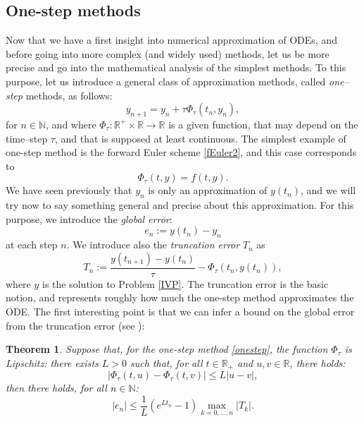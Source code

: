 \documentclass{article}
\newtheorem{theorem}{Theorem}
\begin{document}

\subsection{One-step methods}

Now that we have a first insight into numerical approximation of ODEs, and before going into more complex (and widely used) methods, let us be more precise and go into the mathematical analysis of the simplest methods.
%
%
%
To this purpose, let us introduce a general class of approximation methods, called \emph{one--step} methods, as follows:
\begin{equation} \label{onestep}
y_{n+1} = y_n + \tau \Phi_\tau ( t_n , y_n ),    
\end{equation}
for $n\in\mathbb{N}$, and where $\Phi_\tau : \mathbb{R}^+ \times \mathbb{R} \rightarrow \mathbb{R}$ is a given function, that may depend on the time--step $\tau$, and that is supposed at least continuous. The simplest example of one-step method is the forward Euler scheme \eqref{fEuler2}, and this case corresponds to
\[
\Phi_\tau ( t , y) = f ( t , y).
\]
We have seen previously that $y_n$ is only an approximation of $y(t_n)$, and we will try now to say something general and precise about this approximation. For this purpose, we introduce the \emph{global error}:
\[
e_n := y (t_n) - y_n
\]
at each step $n$. We introduce also the \emph{truncation error} $T_n$ as %
\[
T_n := \frac{y(t_{n+1})-y(t_n)}{\tau} - \Phi_\tau ( t_n, y (t_n ) ),
\]
where $y$ is the solution to Problem \eqref{IVP}.
The truncation error is the basic notion, and represents roughly how much the one-step method approximates the ODE. The first interesting point is that we can infer a bound on the global error from the truncation error (see \cite{suli03}):

\begin{theorem} \label{thmOneStep}
Suppose that, for the one-step method \eqref{onestep}, the function $\Phi_\tau$ is Lipschitz: there exists $L > 0$ such that, for all $t\in\mathbb{R}_+$ and $u,v \in \mathbb{R}$, there holds:
\begin{equation} \label{onestepLipschitz}
| \Phi_\tau ( t , u ) - \Phi_\tau ( t , v ) |
\leq L |u-v|,
\end{equation}
then there holds, for all $n \in \mathbb{N}$:
\begin{equation} \label{onestepError}
|e_n| \leq \frac1L \left (
e^{Lt_n} - 1
\right ) \max_{k=0,\ldots,n} |T_k|.
\end{equation}
\end{theorem}
\end{document}
